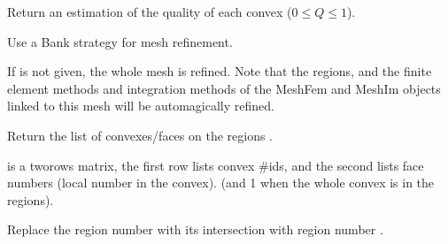 \documentclass[a4paper,11pt,english]{sphinxmanual}
\begin{document}
\begin{fulllineitems}
\begin{fulllineitems}
\end{fulllineitems}


\begin{fulllineitems}
\label{\detokenize{python/cmdref_Mesh:getfem.Mesh.quality}}
Return an estimation of the quality of each convex (\(0 \leq Q \leq 1\)).

\end{fulllineitems}


\begin{fulllineitems}
\label{\detokenize{python/cmdref_Mesh:getfem.Mesh.refine}}
Use a Bank strategy for mesh refinement.

If  is not given, the whole mesh is refined. Note
that the regions, and the finite element methods and
integration methods of the MeshFem and MeshIm objects linked
to this mesh will be automagically refined.

\end{fulllineitems}


\begin{fulllineitems}
\label{\detokenize{python/cmdref_Mesh:getfem.Mesh.region}}
Return the list of convexes/faces on the regions .

 is a two\sphinxhyphen{}rows matrix, the first row lists convex \#ids,
and the second lists face numbers (local number in the convex).
(and \sphinxhyphen{}1 when the whole convex is in the
regions).

\end{fulllineitems}


\begin{fulllineitems}
\label{\detokenize{python/cmdref_Mesh:getfem.Mesh.region_intersect}}
Replace the region number  with its intersection with region number .


\end{fulllineitems}
\end{fulllineitems}
\end{document}
